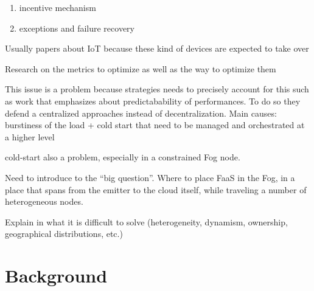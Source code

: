 \documentclass[11pt]{sdm}
\begin{document}
\begin{itemize}
{{\begin{enumerate}
        \item incentive mechanism
        \item exceptions and failure recovery
    \end{enumerate}
    }
    \item Usually papers about IoT because these kind of devices are expected to take over
    \item Research on the metrics to optimize as well as the way to optimize them
    \item This issue is a problem because strategies needs to precisely account for this such as  work that emphasizes about predictabability of performances. To do so they defend a centralized approaches instead of decentralization. Main causes: burstiness of the load + cold start that need to be managed and orchestrated at a higher level
    \item cold-start also a problem, especially in a constrained Fog node.
    \item Need to introduce to the ``big question''. Where to place \gls{FaaS} in the Fog, in a place that spans from the emitter to the cloud itself, while traveling a number of heterogeneous nodes.
    \item Explain in what it is difficult to solve (heterogeneity, dynamism, ownership, geographical distributions, etc.)
    }


    
\end{itemize}

\section{Background}
\end{document}
